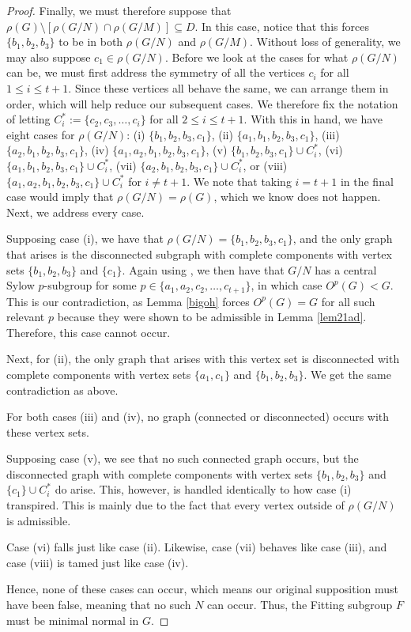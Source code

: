 \documentclass[11pt]{amsart}
\theoremstyle{definition}
\theoremstyle{remark}
\numberwithin{equation}{section}
\begin{document}
\begin{proof}
Finally, we must therefore suppose that $\rho(G)\setminus[\rho(G/N)\cap\rho(G/M)]\subseteq D$. In this case, notice that this forces $\{b_1,b_2,b_3\}$ to be in both $\rho(G/N)$ and $\rho(G/M)$. Without loss of generality, we may also suppose $c_1\in\rho(G/N)$. Before we look at the cases for what $\rho(G/N)$ can be, we must first address the symmetry of all the vertices $c_i$ for all $1\leq i\leq t+1$. Since these vertices all behave the same, we can arrange them in order, which will help reduce our subsequent cases. We therefore fix the notation of letting $C_i^*:=\{c_2,c_3,\ldots,c_i\}$ for all $2\leq i\leq t+1$. With this in hand, we have eight cases for $\rho(G/N)$: (i) $\{b_1,b_2,b_3,c_1\}$, (ii) $\{a_1,b_1,b_2,b_3,c_1\}$, (iii) $\{a_2,b_1,b_2,b_3,c_1\}$, (iv) $\{a_1,a_2,b_1,b_2,b_3,c_1\}$, (v) $\{b_1,b_2,b_3,c_1\}\cup C_i^*$, (vi) $\{a_1,b_1,b_2,b_3,c_1\}\cup C_i^*$, (vii) $\{a_2,b_1,b_2,b_3,c_1\}\cup C_i^*$, or (viii) $\{a_1,a_2,b_1,b_2,b_3,c_1\}\cup C_i^*$ for $i\neq t+1$. We note that taking $i=t+1$ in the final case would imply that $\rho(G/N)=\rho(G)$, which we know does not happen. Next, we address every case.

Supposing case (i), we have that $\rho(G/N)=\{b_1,b_2,b_3,c_1\}$, and the only graph that arises is the disconnected subgraph with complete components with vertex sets $\{b_1,b_2,b_3\}$ and $\{c_1\}$. Again using \cite{L}, we then have that $G/N$ has a central Sylow $p$-subgroup for some $p\in\{a_1,a_2,c_2,\ldots,c_{t+1}\}$, in which case $O^p(G)<G$. This is our contradiction, as Lemma \ref{bigoh} forces $O^p(G)=G$ for all such relevant $p$ because they were shown to be admissible in Lemma \ref{lem21ad}. Therefore, this case cannot occur.

Next, for (ii), the only graph that arises with this vertex set is disconnected with complete components with vertex sets $\{a_1,c_1\}$ and $\{b_1,b_2,b_3\}$. We get the same contradiction as above.

For both cases (iii) and (iv), no graph (connected or disconnected) occurs with these vertex sets.

Supposing case (v), we see that no such connected graph occurs, but the disconnected graph with complete components with vertex sets $\{b_1,b_2,b_3\}$ and $\{c_1\}\cup C_i^*$ do arise. This, however, is handled identically to how case (i) transpired. This is mainly due to the fact that every vertex outside of $\rho(G/N)$ is admissible.

Case (vi) falls just like case (ii). Likewise, case (vii) behaves like case (iii), and case (viii) is tamed just like case (iv).

Hence, none of these cases can occur, which means our original supposition must have been false, meaning that no such $N$ can occur. Thus, the Fitting subgroup $F$ must be minimal normal in $G$.
\end{proof}
\end{document}
